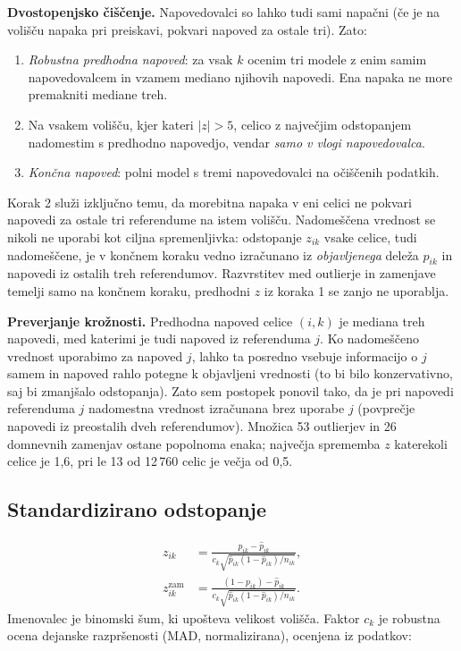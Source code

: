 \documentclass[11pt,a4paper]{article}
\begin{document}
\textbf{Dvostopenjsko čiščenje.} Napovedovalci so lahko tudi sami napačni (če je na volišču napaka pri preiskavi, pokvari napoved za ostale tri). Zato:
\begin{enumerate}
\item \emph{Robustna predhodna napoved}: za vsak $k$ ocenim tri modele z enim samim napovedovalcem in vzamem mediano njihovih napovedi. Ena napaka ne more premakniti mediane treh.
\item Na vsakem volišču, kjer kateri $|z|>5$, celico z največjim odstopanjem nadomestim s predhodno napovedjo, vendar \emph{samo v vlogi napovedovalca}.
\item \emph{Končna napoved}: polni model s tremi napovedovalci na očiščenih podatkih.
\end{enumerate}
Korak 2 služi izključno temu, da morebitna napaka v eni celici ne pokvari napovedi za ostale tri referendume na istem volišču. Nadomeščena vrednost se nikoli ne uporabi kot ciljna spremenljivka: odstopanje $z_{ik}$ vsake celice, tudi nadomeščene, je v končnem koraku vedno izračunano iz \emph{objavljenega} deleža $p_{ik}$ in napovedi iz ostalih treh referendumov. Razvrstitev med outlierje in zamenjave temelji samo na končnem koraku, predhodni $z$ iz koraka 1 se zanjo ne uporablja.

\textbf{Preverjanje krožnosti.} Predhodna napoved celice $(i,k)$ je mediana treh napovedi, med katerimi je tudi napoved iz referenduma $j$. Ko nadomeščeno vrednost uporabimo za napoved $j$, lahko ta posredno vsebuje informacijo o $j$ samem in napoved rahlo potegne k objavljeni vrednosti (to bi bilo konzervativno, saj bi zmanjšalo odstopanja). Zato sem postopek ponovil tako, da je pri napovedi referenduma $j$ nadomestna vrednost izračunana brez uporabe $j$ (povprečje napovedi iz preostalih dveh referendumov). Množica 53 outlierjev in 26 domnevnih zamenjav ostane popolnoma enaka; največja sprememba $z$ katerekoli celice je 1,6, pri le 13 od 12\,760 celic je večja od 0,5.

\subsection{Standardizirano odstopanje}

\begin{align}
z_{ik} &= \frac{p_{ik}-\hat p_{ik}}{c_k\sqrt{\hat p_{ik}(1-\hat p_{ik})/n_{ik}}}, \label{eq:z}\\
z^{\text{zam}}_{ik} &= \frac{(1-p_{ik})-\hat p_{ik}}{c_k\sqrt{\hat p_{ik}(1-\hat p_{ik})/n_{ik}}}. \label{eq:zzam}
\end{align}
Imenovalec je binomski šum, ki upošteva velikost volišča. Faktor $c_k$ je robustna ocena dejanske razpršenosti (MAD, normalizirana), ocenjena iz podatkov:
\end{document}
